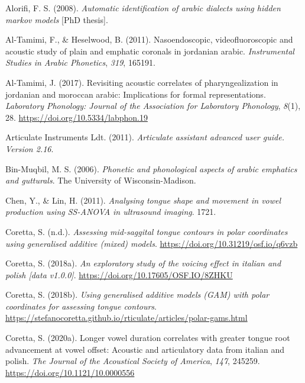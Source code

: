 \documentclass[
  man,
  longtable,
  nolmodern,
  notxfonts,
  notimes,
  colorlinks=true,linkcolor=blue,citecolor=blue,urlcolor=blue]{apa7}
\newlength{\cslhangindent}
\newenvironment{CSLReferences}[2] %
 {\begin{list}{}{%
  \setlength{\itemindent}{0pt}
  \setlength{\leftmargin}{0pt}
  \setlength{\parsep}{0pt}
  \ifodd #1
   \setlength{\leftmargin}{\cslhangindent}
   \setlength{\itemindent}{-1\cslhangindent}
  \fi
  \setlength{\itemsep}{#2\baselineskip}}}
 {\end{list}}
\begin{document}
\label{refs}
\begin{CSLReferences}{1}{0}
Alorifi, F. S. (2008). \emph{Automatic identification of arabic dialects
using hidden markov models} {[}PhD thesis{]}.

Al-Tamimi, F., \& Heselwood, B. (2011). Nasoendoscopic,
videofluoroscopic and acoustic study of plain and emphatic coronals in
jordanian arabic. \emph{Instrumental Studies in Arabic Phonetics},
\emph{319}, 165191.

Al-Tamimi, J. (2017). Revisiting acoustic correlates of
pharyngealization in jordanian and moroccan arabic: Implications for
formal representations. \emph{Laboratory Phonology: Journal of the
Association for Laboratory Phonology}, \emph{8}(1), 28.
\url{https://doi.org/10.5334/labphon.19}

Articulate Instruments Ldt. (2011). \emph{Articulate assistant advanced
user guide. {Version} 2.16}.

Bin-Muqbil, M. S. (2006). \emph{Phonetic and phonological aspects of
arabic emphatics and gutturals}. The University of Wisconsin-Madison.

Chen, Y., \& Lin, H. (2011). \emph{Analysing tongue shape and movement
in vowel production using SS-ANOVA in ultrasound imaging}. 1721.

Coretta, S. (n.d.). \emph{Assessing mid-saggital tongue contours in
polar coordinates using generalised additive (mixed) models}.
\url{https://doi.org/10.31219/osf.io/q6vzb}

Coretta, S. (2018a). \emph{An exploratory study of the voicing effect in
italian and polish {[}data v1.0.0{]}}.
\url{https://doi.org/10.17605/OSF.IO/8ZHKU}

Coretta, S. (2018b). \emph{Using generalised additive models (GAM) with
polar coordinates for assessing tongue contours}.
\url{https://stefanocoretta.github.io/rticulate/articles/polar-gams.html}

Coretta, S. (2020a). Longer vowel duration correlates with greater
tongue root advancement at vowel offset: Acoustic and articulatory data
from italian and polish. \emph{The Journal of the Acoustical Society of
America}, \emph{147}, 245259. \url{https://doi.org/10.1121/10.0000556}


\end{CSLReferences}
\end{document}

